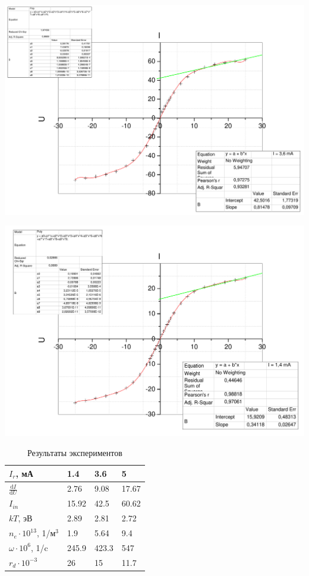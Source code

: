 \documentclass[a4paper,12pt]{article}
\newcommand{\dif}{\mathrm{d}}
\begin{document}
		\includegraphics[width = \linewidth]{36mA}
		
		\includegraphics[width = \linewidth]{14mA}
		
		
		\begin{table}[h]
			\centering
			\caption{Результаты экспериментов}
			\label{my-label}
			\begin{tabular}{|l|l|l|l|}
				\hline
				$I_r$, мА     & 1.4   & 3.6   & 5     \\ \hline
				$\frac{\dif I}{\dif U}$  & 2.76  & 9.08  & 17.67 \\ \hline
				$I_{in}$  & 15.92 & 42.5  & 60.62 \\ \hline
				$kT$, эВ    & 2.89  & 2.81  & 2.72  \\ \hline
				$n_e\cdot 10^{13}$, 1/м$^3$    & 1.9   & 5.64  & 9.4   \\ \hline
				$\omega\cdot 10^{6}$, 1/c & 245.9 & 423.3 & 547   \\ \hline
				$r_d\cdot 10^{-3}$     & 26    & 15    & 11.7  \\ \hline
			\end{tabular}
		\end{table}
		
\end{document}
